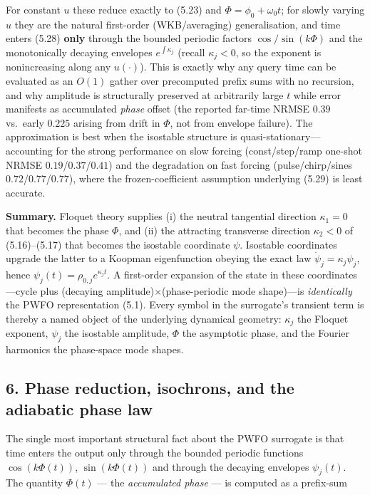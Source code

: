 \documentclass[
  11pt,
]{article}
\providecommand{\lt}{<}
\begin{document}
For constant \(u\) these reduce exactly to (5.23) and
\(\Phi=\phi_0+\omega_0 t\); for slowly varying \(u\) they are the
natural first-order (WKB/averaging) generalisation, and time enters
(5.28) \textbf{only} through the bounded periodic factors
\(\cos/\sin(k\Phi)\) and the monotonically decaying envelopes
\(e^{\int\kappa_j}\) (recall \(\kappa_j\lt 0\), so the exponent is
nonincreasing along any \(u(\cdot)\)). This is exactly why any query
time can be evaluated as an \(O(1)\) gather over precomputed prefix sums
with no recursion, and why amplitude is structurally preserved at
arbitrarily large \(t\) while error manifests as accumulated
\emph{phase} offset (the reported far-time NRMSE \(0.39\) vs.~early
\(0.225\) arising from drift in \(\Phi\), not from envelope failure).
The approximation is best when the isostable structure is
quasi-stationary---accounting for the strong performance on slow forcing
(const/step/ramp one-shot NRMSE \(0.19\)/\(0.37\)/\(0.41\)) and the
degradation on fast forcing (pulse/chirp/sines
\(0.72\)/\(0.77\)/\(0.77\)), where the frozen-coefficient assumption
underlying (5.29) is least accurate.

\textbf{Summary.} Floquet theory supplies (i) the neutral tangential
direction \(\kappa_1=0\) that becomes the phase \(\Phi\), and (ii) the
attracting transverse direction \(\kappa_2\lt 0\) of (5.16)--(5.17) that
becomes the isostable coordinate \(\psi\). Isostable coordinates upgrade
the latter to a Koopman eigenfunction obeying the exact law
\(\dot\psi_j=\kappa_j\psi_j\), hence
\(\psi_j(t)=\rho_{0,j}e^{\kappa_j t}\). A first-order expansion of the
state in these coordinates---cycle plus (decaying
amplitude)\(\times\)(phase-periodic mode shape)---is \emph{identically}
the PWFO representation (5.1). Every symbol in the surrogate's transient
term is thereby a named object of the underlying dynamical geometry:
\(\kappa_j\) the Floquet exponent, \(\psi_j\) the isostable amplitude,
\(\Phi\) the asymptotic phase, and the Fourier harmonics the phase-space
mode shapes.

\subsection{6. Phase reduction, isochrons, and the adiabatic phase
law}\label{phase-reduction-isochrons-and-the-adiabatic-phase-law}

The single most important structural fact about the PWFO surrogate is
that time enters the output only through the bounded periodic functions
\(\cos(k\Phi(t))\), \(\sin(k\Phi(t))\) and through the decaying
envelopes \(\psi_j(t)\). The quantity \(\Phi(t)\) --- the
\emph{accumulated phase} --- is computed as a prefix-sum
\end{document}
